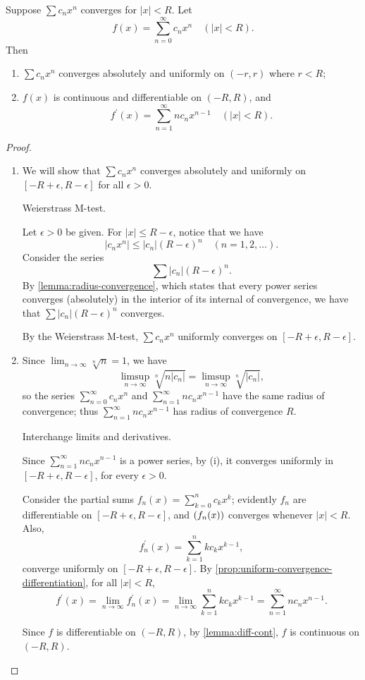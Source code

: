 \begin{proposition}\label{prop:real-power-series-derivative}
Suppose $\sum c_nx^n$ converges for $|x|<R$. Let
\[f(x)=\sum_{n=0}^{\infty}c_nx^n\quad(|x|<R).\]
Then
\begin{enumerate}[label=(\roman*)]
\item $\sum c_nx^n$ converges absolutely and uniformly on $(-r,r)$ where $r<R$;
\item $f(x)$ is continuous and differentiable on $(-R,R)$, and 
\[f^\prime(x)=\sum_{n=1}^\infty nc_nx^{n-1}\quad(|x|<R).\]
\end{enumerate}
\end{proposition}

\begin{proof} \
\begin{enumerate}[label=(\roman*)]
\item We will show that $\sum c_nx^n$ converges absolutely and uniformly on $[-R+\epsilon,R-\epsilon]$ for all $\epsilon>0$. 

\begin{idea}
Weierstrass M-test.
\end{idea}

Let $\epsilon>0$ be given. For $|x|\le R-\epsilon$, notice that we have
\[|c_nx^n|\le|c_n|(R-\epsilon)^n\quad(n=1,2,\dots).\]
Consider the series
\[\sum |c_n|(R-\epsilon)^n.\]
By \cref{lemma:radius-convergence}, which states that every power series converges (absolutely) in the interior of its internal of convergence, we have that $\sum |c_n|(R-\epsilon)^n$ converges.

By the Weierstrass M-test, $\sum c_nx^n$ uniformly converges on $[-R+\epsilon,R-\epsilon]$.

\item Since $\displaystyle\lim_{n\to\infty}\sqrt[n]{n}=1$, we have
\[\limsup_{n\to\infty}\sqrt[n]{n|c_n|}=\limsup_{n\to\infty}\sqrt[n]{|c_n|},\]
so the series $\displaystyle\sum_{n=0}^{\infty} c_nx^n$ and $\displaystyle\sum_{n=1}^{\infty} nc_nx^{n-1}$ have the same radius of convergence; thus $\displaystyle\sum_{n=1}^{\infty} nc_nx^{n-1}$ has radius of convergence $R$.

\begin{idea}
Interchange limits and derivatives.
\end{idea}

Since $\displaystyle\sum_{n=1}^{\infty} nc_nx^{n-1}$ is a power series, by (i), it converges uniformly in $[-R+\epsilon,R-\epsilon]$, for every $\epsilon>0$. 

Consider the partial sums $f_n(x)=\sum_{k=0}^{n}c_kx^k$; evidently $f_n$ are differentiable on $[-R+\epsilon,R-\epsilon]$, and $\left(f_n(x)\right)$ converges whenever $|x|<R$. Also,
\[f_n^\prime(x)=\sum_{k=1}^{n}kc_kx^{k-1},\]
converge uniformly on $[-R+\epsilon,R-\epsilon]$. By \cref{prop:uniform-convergence-differentiation}, for all $|x|<R$,
\[f^\prime(x)=\lim_{n\to\infty}f_n^\prime(x)
=\lim_{n\to\infty}\sum_{k=1}^{n}kc_kx^{k-1}
=\sum_{n=1}^\infty nc_nx^{n-1}.\]

Since $f$ is differentiable on $(-R,R)$, by \cref{lemma:diff-cont}, $f$ is continuous on $(-R,R)$.
\end{enumerate}
\end{proof}

